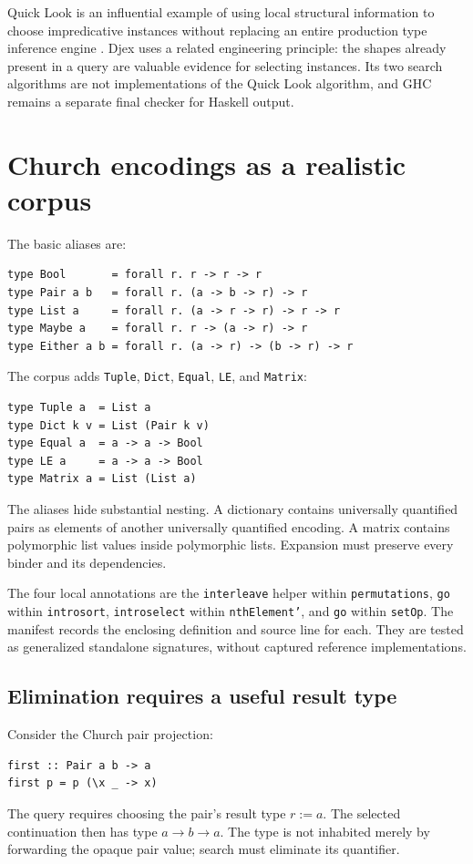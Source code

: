 \documentclass[11pt]{article}
\newcommand{\code}[1]{\texttt{#1}}
\begin{document}
Quick Look is an influential example of using local structural information to
choose impredicative instances without replacing an entire production type
inference engine \cite{quicklook}. Djex uses a related engineering principle:
the shapes already present in a query are valuable evidence for selecting
instances. Its two search algorithms are not implementations of the Quick
Look algorithm, and GHC remains a separate final checker for Haskell output.

\section{Church encodings as a realistic corpus}

The basic aliases are:
\begin{lstlisting}
type Bool       = forall r. r -> r -> r
type Pair a b   = forall r. (a -> b -> r) -> r
type List a     = forall r. (a -> r -> r) -> r -> r
type Maybe a    = forall r. r -> (a -> r) -> r
type Either a b = forall r. (a -> r) -> (b -> r) -> r
\end{lstlisting}
The corpus adds \code{Tuple}, \code{Dict}, \code{Equal}, \code{LE}, and
\code{Matrix}:
\begin{lstlisting}
type Tuple a  = List a
type Dict k v = List (Pair k v)
type Equal a  = a -> a -> Bool
type LE a     = a -> a -> Bool
type Matrix a = List (List a)
\end{lstlisting}
The aliases hide substantial nesting. A dictionary contains universally
quantified pairs as elements of another universally quantified encoding. A
matrix contains polymorphic list values inside polymorphic lists. Expansion
must preserve every binder and its dependencies.

The four local annotations are the \code{interleave} helper within
\code{permutations}, \code{go} within \code{introsort},
\code{introselect} within \code{nthElement'}, and \code{go} within
\code{setOp}. The manifest records the enclosing definition and source line
for each. They are tested as generalized standalone signatures, without
captured reference implementations.

\subsection{Elimination requires a useful result type}

Consider the Church pair projection:
\begin{lstlisting}
first :: Pair a b -> a
first p = p (\x _ -> x)
\end{lstlisting}
The query requires choosing the pair's result type $r := a$. The selected
continuation then has type $a \to b \to a$. The type is not inhabited merely
by forwarding the opaque pair value; search must eliminate its quantifier.
\end{document}
